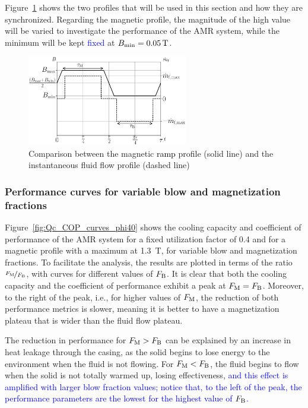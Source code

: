 \documentclass[referee]{svjour3}
\newcommand{\bmin}{\ensuremath{{B}\ped{min}}}
\begin{document}
 Figure~\ref{fig:ramp-inst} shows the two profiles that will be used in this section and how they are synchronized. Regarding the magnetic profile, the magnitude of the high value will be varied to investigate the performance of the AMR system, while the minimum will be kept \textcolor{blue}{fixed} at $\bmin = \SI{0.05}{\tesla}$. 

\begin{figure}[!ht]
  \centering
  \includegraphics[width=7cm]{Fig13-profiles_rm_and_flow_instantaneous}
  \caption{Comparison between the magnetic \textcolor{black}{ramp} profile (solid line) and the instantaneous fluid flow profile (dashed line)}
  \label{fig:ramp-inst}
\end{figure}
 
\subsubsection{Performance curves for variable blow and magnetization fractions}
\label{sec:perf-curv-vary}

Figure~\ref{fig:Qc_COP_curves_phi40} shows the cooling capacity and coefficient of performance of the AMR system for a fixed utilization factor of \num{0.4} and for a magnetic profile with a maximum at \SI{1.3}{\tesla}, for variable blow and magnetization fractions. To facilitate the analysis, the results are plotted in terms of the ratio $\nicefrac{F_{\mathrm{M}}}{F_{\mathrm{B}}}$, with curves for different values of $F_{\mathrm{B}}$. It is clear that both the cooling capacity and the coefficient of performance exhibit a peak at $F_{\mathrm{M}} = F_{\mathrm{B}}$. Moreover, to the right of the peak, i.e., for higher values of $F_{\mathrm{M}}$, the reduction of both performance metrics is slower, meaning it is better to have a magnetization plateau that is wider than the fluid flow plateau.

The reduction in performance for $F_{\mathrm{M}} > F_{\mathrm{B}}$ can be explained by an increase in heat leakage through the casing, as the solid begins to lose energy to the environment when the fluid is not flowing. For $F_{\mathrm{M}} < F_{\mathrm{B}}$,  the fluid begins to flow when the solid is not totally warmed up, losing effectiveness, \textcolor{blue}{and this effect is amplified with larger blow fraction values; notice that, to the left of the peak, the performance parameters are the lowest for the highest value of $F_{\mathrm{B}}$.}
\end{document}
